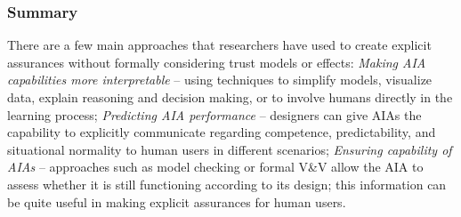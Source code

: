 \subsubsection{Summary}
    There are a few main approaches that researchers have used to create explicit assurances without formally considering trust models or effects: 
    \textit{Making AIA capabilities more interpretable} -- using techniques to simplify models, visualize data, explain reasoning and decision making, or to involve humans directly in the learning process; 
     \textit{Predicting AIA performance} -- designers can give AIAs the capability to explicitly communicate regarding competence, predictability, and situational normality to human users in different scenarios; 
     \textit{Ensuring capability of AIAs} -- approaches such as model checking or formal V\&V allow the AIA to assess whether it is still functioning according to its design; this information can be quite useful in making explicit assurances for human users.


